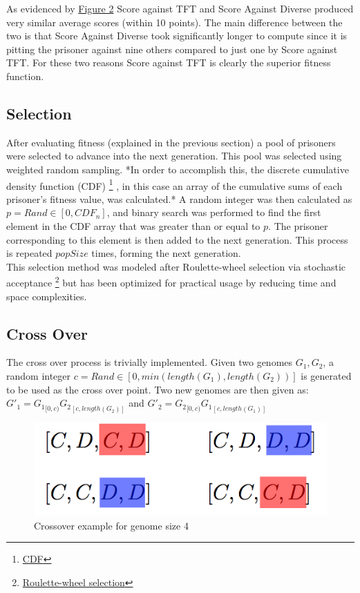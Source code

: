 \documentclass[12pt]{article}
\begin{document}
As evidenced by \hyperref[fig2]{Figure 2} Score against TFT and Score Against Diverse
produced very similar average scores (within 10 points).  The main difference
between the two is that Score Against Diverse took significantly longer to compute
since it is pitting the prisoner against nine others compared to just one by Score against TFT.
For these two reasons Score against TFT is clearly the superior fitness function.

\subsection{Selection}

After evaluating fitness (explained in the previous section) a pool of
prisoners were selected to advance into the next generation.  This pool was
selected using weighted random sampling.  *In order to accomplish this, the
discrete cumulative density function (CDF)
\footnote{\href{https://en.wikipedia.org/wiki/Cumulative distribution function}{CDF}}
, in this case an array of the cumulative sums of each prisoner's fitness value,
was calculated.*  A random integer was then calculated as $p = Rand \in [0, CDF_n]$,
and binary search was performed to find the first element in the CDF array that
was greater than or equal to $p$.  The prisoner corresponding to this element
is then added to the next generation.  This process is repeated $popSize$ times, 
forming the next generation. \\

This selection method was modeled after Roulette-wheel selection via stochastic acceptance
\footnote{\href{http://arxiv.org/pdf/1109.3627.pdf}{Roulette-wheel selection}}
but has been optimized for practical usage by reducing time and space complexities.

\subsection{Cross Over}

The cross over process is trivially implemented.  Given two genomes $G_1, G_2$,
a random integer $c = Rand \in [0, min(length(G_1), length(G_2))]$ is generated
to be used as the cross over point.  Two new genomes are then given as:\\

$G'_1 = {G_1}_{[0,c)}{G_2}_{[c, length(G_2)]}$ and
$G'_2 = {G_2}_{[0, c)}{G_1}_{[c, length(G_1)]}$ \\

\begin{figure}[h]
    \centering
    \includegraphics[scale=0.5]{figures/crossover-example.png}
    \caption{Crossover example for genome size 4}
\end{figure}
\end{document}

